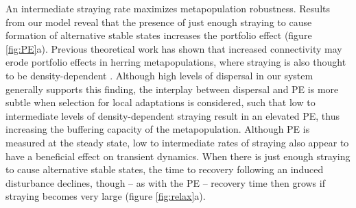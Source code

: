 \documentclass{revtex4}
\begin{document}
An intermediate straying rate maximizes metapopulation robustness. 
Results from our model reveal that the presence of just enough straying to cause formation of alternative stable states increases the portfolio effect (figure \ref{fig:PE}a). 
Previous theoretical work has shown that increased connectivity may erode portfolio effects in herring metapopulations, where straying is also thought to be density-dependent \citep{Secor:2009ena}.
Although high levels of dispersal in our system generally supports this finding, the interplay between dispersal and PE is more subtle when selection for local adaptations is considered, such that low to intermediate levels of density-dependent straying result in an elevated PE, thus increasing the buffering capacity of the metapopulation.
Although PE is measured at the steady state, low to intermediate rates of straying also appear to have a beneficial effect on transient dynamics.
When there is just enough straying to cause alternative stable states, the time to recovery following an induced disturbance declines, though -- as with the PE -- recovery time then grows if straying becomes very large (figure \ref{fig:relax}a).

\end{document}
